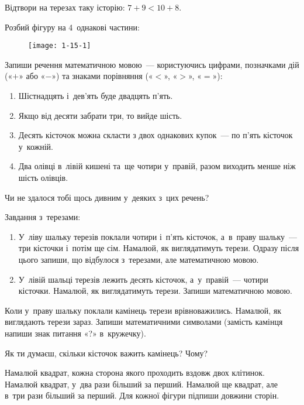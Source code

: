 \problem
Відтвори на терезах таку історію: $7+9 < 10+8$.


\problem
Розбий фігуру на 4~однакові частини:

\begin{figure}[h]
    \centering
    \texttt{[image: 1-15-1]}
\end{figure}


\problem
Запиши речення математичною мовою~--- користуючись цифрами,
позначками дій («$+$» або «$-$») та знаками порівняння («$<$», «$>$», «$=$»):
\begin{enumerate}
    \item Шістнадцять і~дев'ять буде двадцять п'ять.
    \item Якщо від десяти забрати три, то вийде шість.
    \item Десять кісточок можна скласти з двох однакових купок~---
    по п'ять кісточок у~кожній.
    \item Два олівці в~лівій кишені та~ще чотири у~правій,
    разом виходить менше ніж шість олівців.
\end{enumerate}
Чи не здалося тобі щось дивним у~деяких з~цих речень?

\problem
Завдання з~терезами:
\begin{enumerate}
    \item У~ліву шальку терезів поклали чотири і~п'ять кісточок,
    а~в~праву шальку~--- три кісточки і~потім ще сім.
    Намалюй, як виглядатимуть терези.
    Одразу після цього запиши, що відбулося з~терезами,
    але математичною мовою.
    \item У~лівій шальці терезів лежить десять кісточок,
    а~у~правій~--- чотири кісточки.
    Намалюй, як виглядатимуть терези. Запиши математичною мовою.
\end{enumerate}

Коли у~праву шальку поклали камінець терези врівноважились.
Намалюй, як виглядають терези зараз.
Запиши математичними символами
(замість камінця напиши знак питання «?» в~кружечку).

Як ти думаєш, скільки кісточок важить камінець? Чому?


\problem
Намалюй квадрат, кожна сторона якого проходить вздовж двох клітинок.
Намалюй квадрат, у~два рази більший за перший.
Намалюй ще квадрат, але в~три рази більший за перший.
Для кожної фігури підпиши довжини сторін.


